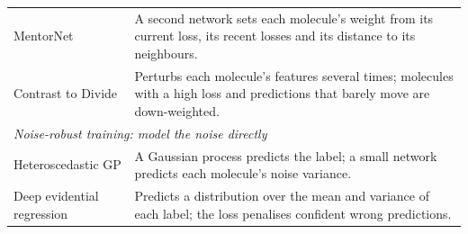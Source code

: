 \begin{table}[htbp]
\begin{tabular}{p{}p{}}
MentorNet \citep{jiang2018mentornet} & A second network sets each molecule's weight from its current loss, its recent losses and its distance to its neighbours. \\
Contrast to Divide \citep{zheltonozhskii2021contrast} & Perturbs each molecule's features several times; molecules with a high loss and predictions that barely move are down-weighted. \\
\midrule
\multicolumn{2}{l}{\textit{Noise-robust training: model the noise directly}} \\
Heteroscedastic GP \citep{liu2020} & A Gaussian process predicts the label; a small network predicts each molecule's noise variance. \\
Deep evidential regression \citep{amini2020deep} & Predicts a distribution over the mean and variance of each label; the loss penalises confident wrong predictions. \\
\bottomrule
\end{tabular}
\end{table}

